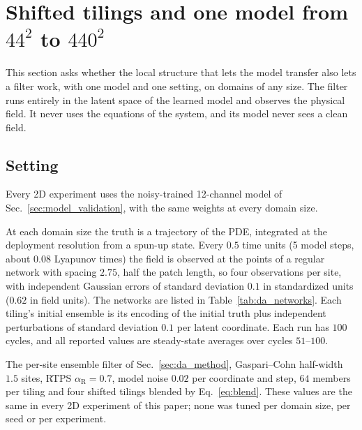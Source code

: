 \section{Shifted tilings and one model from \texorpdfstring{$44^2$ to $440^2$}{44x44 to 440x440}}
\label{sec:da_results}

This section asks whether the local structure that lets the model transfer
also lets a filter work, with one model and one setting, on domains of any
size. The filter runs entirely in the latent space of the learned model and
observes the physical field. It never uses the equations of the system, and
its model never sees a clean field.

\subsection{Setting}
\label{sec:da_setting}

 Every 2D experiment uses the noisy-trained 12-channel
model of Sec.~\ref{sec:model_validation}, with the same weights at every
domain size.

 At each domain size the truth is a trajectory of
the PDE, integrated at the deployment resolution from a spun-up state.
Every $0.5$ time units (5 model steps, about $0.08$ Lyapunov times) the
field is observed at the points of a regular network with spacing
$2.75$, half the patch length, so four observations per site, with
independent Gaussian errors of standard deviation $0.1$ in standardized
units ($0.62$ in field units). The networks are listed in
Table~\ref{tab:da_networks}. Each tiling's initial ensemble is its
encoding of the initial truth plus independent perturbations of
standard deviation $0.1$ per latent coordinate. Each run has $100$
cycles, and all reported values are steady-state averages over cycles
$51$--$100$.

 The per-site ensemble filter of
Sec.~\ref{sec:da_method}, Gaspari--Cohn half-width $1.5$ sites, RTPS
$\alpha_{\mathrm R}=0.7$, model noise $0.02$ per coordinate and step, $64$ members per
tiling and four shifted tilings blended by Eq.~\eqref{eq:blend}. These
values are the same in every 2D experiment of this paper; none was tuned
per domain size, per seed or per experiment.

